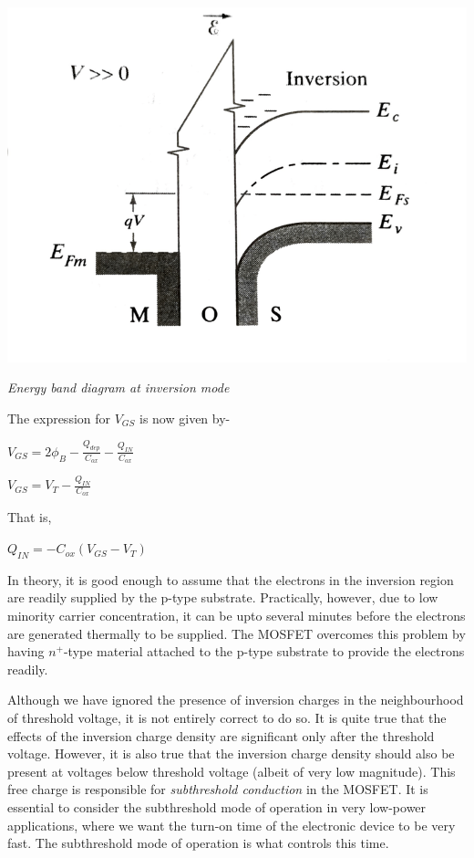\documentclass[12 pt]{article}
\begin{document}
\par
\begin{center}
    \includegraphics{Inversion_mode.png}
\end{center}
\begin{center}
    \emph{\hspace{2 cm}Energy band diagram at inversion mode\newline}
\end{center}
\par

The expression for $V_{GS}$ is now given by-
\begin{center}
    $ V_{GS} = 2\phi_{B} - \frac{Q_{dep}}{C_{ox}} - \frac{Q_{IN}}{C_{ox}}$
\end{center}
\begin{center}
    $ V_{GS} = V_{T} - \frac{Q_{IN}}{C_{ox}}$
\end{center}
That is, 
\begin{center}
    $ Q_{IN} = -C_{ox}(V_{GS}-V_{T}) $
\end{center}
In theory, it is good enough to assume that the electrons in the inversion region are readily supplied by the p-type substrate. Practically, however, due to low minority carrier concentration, it can be upto several minutes before the electrons are generated thermally to be supplied. The MOSFET overcomes this problem by having $n^{+}$-type material attached to the p-type substrate to provide the electrons readily. \par

Although we have ignored the presence of inversion charges in the neighbourhood of threshold voltage, it is not entirely correct to do so. It is quite true that the effects of the inversion charge density are significant only after the threshold voltage. However, it is also true that the inversion charge density should also be present at voltages below threshold voltage (albeit of very low magnitude). This free charge is responsible for \emph{subthreshold conduction} in the MOSFET. It is essential to consider the subthreshold mode of operation in very low-power applications, where we want the turn-on time of the electronic device to be very fast. The subthreshold mode of operation is what controls this time. 
\end{document}
